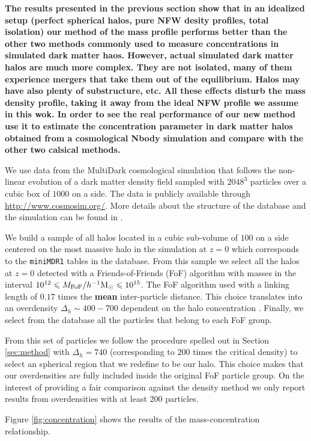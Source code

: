 \documentclass[a4,useAMS,usenatbib,usegraphicx]{mn2e}
\newcommand{\hMpc}{{\ifmmode{h^{-1}{\rm Mpc}}\else{$h^{-1}$Mpc}\fi}}
\newcommand{\hMsun}{{\ifmmode{h^{-1}{\rm {M_{\odot}}}}\else{$h^{-1}{\rm{M_{\odot}}}$}\fi}}
\begin{document}
{\bf The results presented in the previous section show that in an
  idealized setup (perfect spherical halos, pure NFW desity profiles,
  total isolation) our method of the mass profile performs better than
  the other two methods commonly used to measure concentrations in
  simulated dark matter haos. However, actual simulated dark matter
  halos are much more complex. They are not isolated, many of them
  experience mergers that take them out of the equilibrium. Halos may
  have also plenty of substructure, etc. All these effects disturb the
  mass density profile, taking it away from the ideal NFW profile we
  assume in this wok. In order to see the real performance of our new
  method use it to estimate the concentration parameter in dark matter
  halos obtained from a cosmological Nbody simulation and compare with
  the other two calsical methods.}

We use data from the MultiDark cosmological simulation that follows
the non-linear evolution of a dark matter density field sampled with
$2048^3$ particles over a cubic box of $1000$ \hMpc on a side.  The
data is publicly available through \url{http://www.cosmosim.org/}.
More details about the structure of the database and the simulation
can be found in \citep{2013AN....334..691R}.

We build a sample of all halos located in a cubic sub-volume of $100$
\hMpc on a side centered on the most massive halo in the simulation at
$z=0$ which corresponds to the \texttt{miniMDR1} tables in the
database.  From this sample we select all the halos at $z=0$ detected
with a Friends-of-Friends (FoF) algorithm with masses in the interval
$10^{12}\leq M_{\rm FoF}/\hMsun \leq 10^{15}$.  The FoF algorithm used
with a linking length of $0.17$ times the {\bf mean} inter-particle
distance. This choice translates into an overdensity $\Delta_h\sim
400-700$ dependent on the halo concentration \citep{More2011}.
Finally, we select from the database all the particles that belong to
each FoF group.

From this set of particles we follow the procedure spelled out in
Section \ref{sec:method} with $\Delta_h=740$ (corresponding to $200$
times the critical density) to select an spherical region that we
redefine to be our halo.  This choice makes that our overdensities are
fully included inside the original FoF particle group.  On the
interest of providing a fair comparison against the density method we
only report results from overdensities with at least $200$ particles.

Figure \ref{fig:concentration} shows the results of the
mass-concentration relationship.
\end{document}

